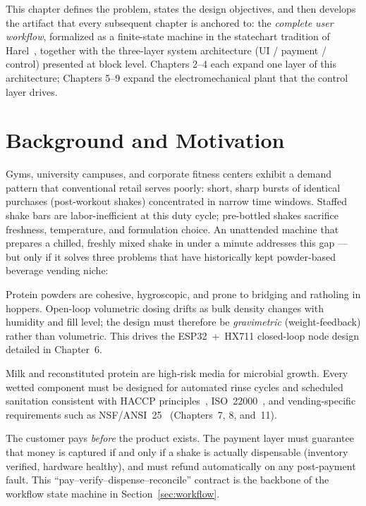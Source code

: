 This chapter defines the problem, states the design objectives, and then
develops the artifact that every subsequent chapter is anchored to: the
\emph{complete user workflow}, formalized as a finite-state machine in the
statechart tradition of Harel~\cite{harel1987statecharts}, together with the
three-layer system architecture (UI / payment / control) presented at block
level. Chapters 2--4 each expand one layer of this architecture; Chapters
5--9 expand the electromechanical plant that the control layer drives.

\section{Background and Motivation}
\label{sec:background}

Gyms, university campuses, and corporate fitness centers exhibit a demand
pattern that conventional retail serves poorly: short, sharp bursts of
identical purchases (post-workout shakes) concentrated in narrow time
windows. Staffed shake bars are labor-inefficient at this duty cycle;
pre-bottled shakes sacrifice freshness, temperature, and formulation choice.
An unattended machine that prepares a chilled, freshly mixed shake in under
a minute addresses this gap --- but only if it solves three problems that
have historically kept powder-based beverage vending niche:

\begin{description}[itemsep=2pt]
  \item[Dosing repeatability.] Protein powders are cohesive, hygroscopic,
    and prone to bridging and ratholing in hoppers. Open-loop volumetric
    dosing drifts as bulk density changes with humidity and fill level;
    the design must therefore be \emph{gravimetric} (weight-feedback) rather
    than volumetric. This drives the ESP32~+~HX711 closed-loop node design
    detailed in Chapter~6.
  \item[Hygiene of the wet path.] Milk and reconstituted protein are
    high-risk media for microbial growth. Every wetted component must be
    designed for automated rinse cycles and scheduled sanitation consistent
    with HACCP principles~\cite{codexhaccp}, ISO~22000~\cite{iso22000}, and
    vending-specific requirements such as NSF/ANSI~25~\cite{nsf25}
    (Chapters~7, 8, and~11).
  \item[Unattended trust.] The customer pays \emph{before} the product
    exists. The payment layer must guarantee that money is captured if and
    only if a shake is actually dispensable (inventory verified, hardware
    healthy), and must refund automatically on any post-payment fault. This
    ``pay--verify--dispense--reconcile'' contract is the backbone of the
    workflow state machine in Section~\ref{sec:workflow}.
\end{description}

